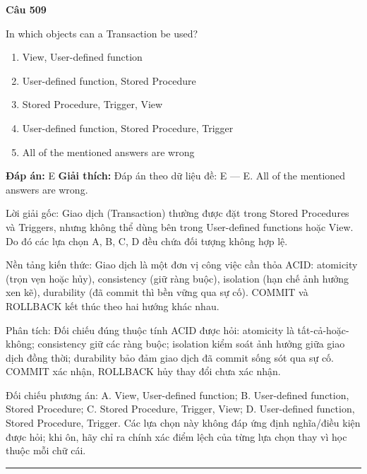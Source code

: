 \documentclass[11pt,a4paper]{article}
\newenvironment{question}[1]{%
  \par\vspace{1em}\noindent\textbf{\large Câu #1}\par\vspace{0.4em}
}{%
  \par\vspace{1em}\hrule\vspace{0.6em}
}
\newenvironment{choices}{%
  \begin{enumerate}[label=\textbf{\Alph*.},leftmargin=2.2em,itemsep=2pt,topsep=3pt]
}{%
  \end{enumerate}
}
\newcommand{\choice}{\item}
\begin{document}
\begin{question}{509}
In which objects can a Transaction be used?
\begin{choices}
\choice View, User-defined function
\choice User-defined function, Stored Procedure
\choice Stored Procedure, Trigger, View
\choice User-defined function, Stored Procedure, Trigger
\choice All of the mentioned answers are wrong
\end{choices}
\textbf{Đáp án:} E
\textbf{Giải thích:} Đáp án theo dữ liệu đề: E — E. All of the mentioned answers are wrong.

Lời giải gốc: Giao dịch (Transaction) thường được đặt trong Stored Procedures và Triggers, nhưng không thể dùng bên trong User-defined functions hoặc View. Do đó các lựa chọn A, B, C, D đều chứa đối tượng không hợp lệ.

Nền tảng kiến thức: Giao dịch là một đơn vị công việc cần thỏa ACID: atomicity (trọn vẹn hoặc hủy), consistency (giữ ràng buộc), isolation (hạn chế ảnh hưởng xen kẽ), durability (đã commit thì bền vững qua sự cố). COMMIT và ROLLBACK kết thúc theo hai hướng khác nhau.

Phân tích: Đối chiếu đúng thuộc tính ACID được hỏi: atomicity là tất-cả-hoặc-không; consistency giữ các ràng buộc; isolation kiểm soát ảnh hưởng giữa giao dịch đồng thời; durability bảo đảm giao dịch đã commit sống sót qua sự cố. COMMIT xác nhận, ROLLBACK hủy thay đổi chưa xác nhận.

Đối chiếu phương án: A. View, User-defined function; B. User-defined function, Stored Procedure; C. Stored Procedure, Trigger, View; D. User-defined function, Stored Procedure, Trigger. Các lựa chọn này không đáp ứng định nghĩa/điều kiện được hỏi; khi ôn, hãy chỉ ra chính xác điểm lệch của từng lựa chọn thay vì học thuộc mỗi chữ cái.
\end{question}
\end{document}
